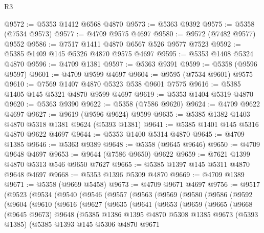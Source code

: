 \begin{lexlean}{R3}
\begin{coremodule}
@9572 := @5353 @1412 @6568 @4870
@9573 := @5363 @9392
@9575 := @5358 (@7534 @9573)
@9577 := @4709 @9575 @4697
@9580 := @9572 (@7482 @9577) @9552
@9586 := @7517 @1411 @4870 @6567 @526 @9577 @7523
@9592 := @5385 @1409 @145 @5326 @4870 @9575 @4697
@9595 := @5353 @1408 @5324 @4870
@9596 := @4709 @1381
@9597 := @5363 @9391
@9599 := @5358 (@9596 @9597)
@9601 := @4709 @9599 @4697
@9604 := @9595 (@7534 @9601) @9575
@9610 := @7569 @1407 @4870 @5323 @538 @9601 @7575
@9616 := @5385 @1405 @145 @5321 @4870 @9599 @4697
@9619 := @5353 @1404 @5319 @4870
@9620 := @5363 @9390
@9622 := @5358 (@7586 @9620)
@9624 := @4709 @9622 @4697
@9627 := @9619 (@9596 @9624) @9599
@9635 := @5385 @1382 @1403 @4870 @5318 @1381 @9624 (@5393 @1381)
@9641 := @5385 @1401 @145 @5316 @4870 @9622 @4697
@9644 := @5353 @1400 @5314 @4870
@9645 := @4709 @1385
@9646 := @5363 @9389
@9648 := @5358 (@9645 @9646)
@9650 := @4709 @9648 @4697
@9653 := @9644 (@7586 @9650) @9622
@9659 := @7621 @1399 @4870 @5313 @546 @9650 @7627
@9665 := @5385 @1397 @145 @5311 @4870 @9648 @4697
@9668 := @5353 @1396 @5309 @4870
@9669 := @4709 @1389
@9671 := @5358 (@9669 @5458)
@9673 := @4709 @9671 @4697
@9756 := @9517
    (@9523
      (@9534
        (@9540
          (@9546
            (@9557
              (@9563
                (@9569
                  (@9580
                    (@9586
                      (@9592
                        (@9604
                          (@9610
                            (@9616
                              (@9627
                                (@9635
                                  (@9641
                                    (@9653
                                      (@9659
                                        (@9665
                                          (@9668
                                            (@9645 @9673)
                                            @9648
                                            (@5385
                                              @1386
                                              @1395
                                              @4870
                                              @5308
                                              @1385
                                              @9673
                                              (@5393 @1385)
                                              (@5385
                                                @1393
                                                @145
                                                @5306
                                                @4870
                                                @9671

\end{coremodule}
\end{lexlean}
